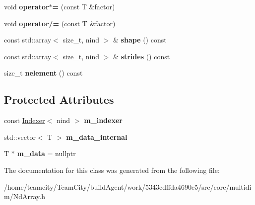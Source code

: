 \begin{DoxyCompactItemize}
\item 
void {\bfseries operator$\ast$=} (const T \&factor)\hypertarget{classNdArray_a116dd08b9597a15a23305c9de8019080}{}\label{classNdArray_a116dd08b9597a15a23305c9de8019080}

\item 
void {\bfseries operator/=} (const T \&factor)\hypertarget{classNdArray_a9ad1ece332482cc4c413e626abed0bd5}{}\label{classNdArray_a9ad1ece332482cc4c413e626abed0bd5}

\item 
const std\+::array$<$ size\+\_\+t, nind $>$ \& {\bfseries shape} () const \hypertarget{classNdArray_aecaaa98567c6557750b6df6fd9bf3b33}{}\label{classNdArray_aecaaa98567c6557750b6df6fd9bf3b33}

\item 
const std\+::array$<$ size\+\_\+t, nind $>$ \& {\bfseries strides} () const \hypertarget{classNdArray_a02144f38edc02b17588da9307a151ee8}{}\label{classNdArray_a02144f38edc02b17588da9307a151ee8}

\item 
size\+\_\+t {\bfseries nelement} () const \hypertarget{classNdArray_a6034fb98cbd6650510e03b3ca73e3534}{}\label{classNdArray_a6034fb98cbd6650510e03b3ca73e3534}

\end{DoxyCompactItemize}
\subsection*{Protected Attributes}
\begin{DoxyCompactItemize}
\item 
const \hyperlink{classIndexer}{Indexer}$<$ nind $>$ {\bfseries m\+\_\+indexer}\hypertarget{classNdArray_a4082540c66c57d0c8c28520fc59ffbb0}{}\label{classNdArray_a4082540c66c57d0c8c28520fc59ffbb0}

\item 
std\+::vector$<$ T $>$ {\bfseries m\+\_\+data\+\_\+internal}\hypertarget{classNdArray_afcb35374f4e3b0147e93337515c0debe}{}\label{classNdArray_afcb35374f4e3b0147e93337515c0debe}

\item 
T $\ast$ {\bfseries m\+\_\+data} = nullptr\hypertarget{classNdArray_af6304855cc6c99ad4d17f28e6405859f}{}\label{classNdArray_af6304855cc6c99ad4d17f28e6405859f}

\end{DoxyCompactItemize}


The documentation for this class was generated from the following file\+:\begin{DoxyCompactItemize}
\item 
/home/teamcity/\+Team\+City/build\+Agent/work/5343cdffda4690e5/src/core/multidim/Nd\+Array.\+h\end{DoxyCompactItemize}
